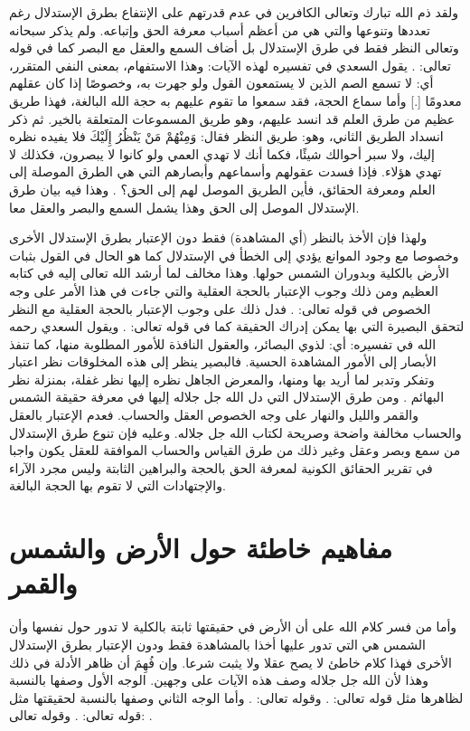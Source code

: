 ولقد ذم الله تبارك وتعالى الكافرين في عدم قدرتهم على الإنتفاع بطرق الإستدلال رغم تعددها وتنوعها والتي هي من أعظم أسباب معرفة الحق وإتباعه. ولم يذكر سبحانه وتعالى النظر فقط في طرق الإستدلال بل أضاف السمع والعقل مع البصر كما في قوله تعالى: \quranayah*[10][42-43]{\footnotesize \surahname*[10]}. يقول السعدي في تفسيره لهذه الآيات: وهذا الاستفهام، بمعنى النفي المتقرر، أي: لا تسمع الصم الذين لا يستمعون القول ولو جهرت به، وخصوصًا إذا كان عقلهم معدومًا [.] وأما سماع الحجة، فقد سمعوا ما تقوم عليهم به حجة الله البالغة، فهذا طريق عظيم من طرق العلم قد انسد عليهم، وهو طريق المسموعات المتعلقة بالخير. ثم ذكر انسداد الطريق الثاني، وهو: طريق النظر فقال: {وَمِنْهُمْ مَنْ يَنْظُرُ إِلَيْكَ} فلا يفيده نظره إليك، ولا سبر أحوالك شيئًا، فكما أنك لا تهدي العمي ولو كانوا لا يبصرون، فكذلك لا تهدي هؤلاء. فإذا فسدت عقولهم وأسماعهم وأبصارهم التي هي الطرق الموصلة إلى العلم ومعرفة الحقائق، فأين الطريق الموصل لهم إلى الحق؟ \cite{tafsir_Saadi}. وهذا فيه بيان طرق الإستدلال الموصل إلى الحق وهذا يشمل السمع والبصر والعقل معا.

ولهذا فإن الأخذ بالنظر (أي المشاهدة) فقط دون الإعتبار بطرق الإستدلال الأخرى وخصوصا مع وجود الموانع يؤدي إلى الخطأ في الإستدلال كما هو الحال في القول بثبات الأرض بالكلية وبدوران الشمس حولها. وهذا مخالف لما أرشد الله تعالى إليه في كتابه العظيم ومن ذلك وجوب الإعتبار بالحجة العقلية والتي جاءت في هذا الأمر على وجه الخصوص في قوله تعالى: \quranayah*[3][190]{\footnotesize \surahname*[3]}. فدل ذلك على وجوب الإعتبار بالحجة العقلية مع النظر لتحقق البصيرة التي بها يمكن إدراك الحقيقة كما في قوله تعالى: \quranayah*[24][44]{\footnotesize \surahname*[24]}. ويقول السعدي رحمه الله في تفسيره: أي: لذوي البصائر، والعقول النافذة للأمور المطلوبة منها، كما تنفذ الأبصار إلى الأمور المشاهدة الحسية. فالبصير ينظر إلى هذه المخلوقات نظر اعتبار وتفكر وتدبر لما أريد بها ومنها، والمعرض الجاهل نظره إليها نظر غفلة، بمنزلة نظر البهائم \cite{tafsir_Saadi}. ومن طرق الإستدلال التي دل الله جل جلاله إليها في معرفة حقيقة الشمس والقمر والليل والنهار على وجه الخصوص العقل والحساب. فعدم الإعتبار بالعقل والحساب مخالفة واضحة وصريحة لكتاب الله جل جلاله. وعليه فإن تنوع طرق الإستدلال من سمع وبصر وعقل وغير ذلك من طرق القياس والحساب الموافقة للعقل يكون واجبا في تقرير الحقائق الكونية لمعرفة الحق بالحجة والبراهين الثابتة وليس مجرد الآراء والإجتهادات التي لا تقوم بها الحجة البالغة.

\section{مفاهيم خاطئة حول الأرض والشمس والقمر}

وأما من فسر كلام الله على أن الأرض في حقيقتها ثابتة بالكلية لا تدور حول نفسها وأن الشمس هي التي تدور عليها أخذا بالمشاهدة فقط ودون الإعتبار بطرق الإستدلال الأخرى فهذا كلام خاطئ لا يصح عقلا ولا يثبت شرعا. وإن فُهِمَ أن ظاهر الأدلة في ذلك وهذا لأن الله جل جلاله وصف هذه الآيات على وجهين. الوجه الأول وصفها بالنسبة لظاهرها مثل قوله تعالى: 
\quranayah*[2][258][24-35] {\footnotesize (\surahname*[2])}. وقوله تعالى: 
\quranayah*[18][17][1-14] {\footnotesize (\surahname*[18])}. وأما الوجه الثاني وصفها بالنسبة لحقيقتها مثل قوله تعالى: 
\quranayah*[21][31-33] {\footnotesize (\surahname*[21])}. وقوله تعالى: 
\quranayah*[36][37-40] {\footnotesize (\surahname*[36])}. 

